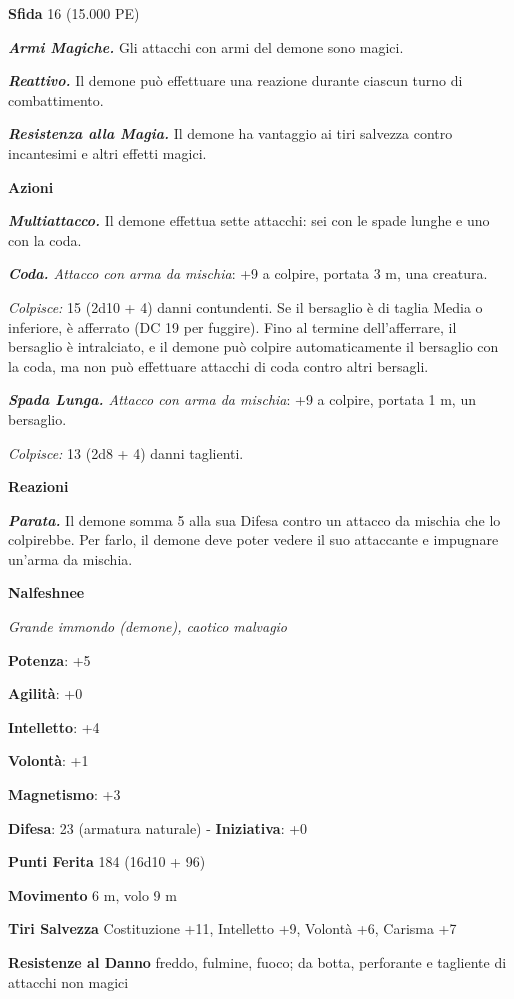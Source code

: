 \begin{multicols}{2}
\textbf{Sfida} 16 (15.000 PE)\smallskip

\emph{\textbf{Armi Magiche.}} Gli attacchi con armi del demone sono
magici.

\emph{\textbf{Reattivo.}} Il demone può effettuare una reazione durante
ciascun turno di combattimento.

\emph{\textbf{Resistenza alla Magia.}} Il demone ha vantaggio ai tiri
salvezza contro incantesimi e altri effetti magici.

\smallskip\textbf{Azioni}

\emph{\textbf{Multiattacco.}} Il demone effettua sette attacchi: sei con
le spade lunghe e uno con la coda.

\emph{\textbf{Coda.} Attacco con arma da mischia}: +9 a colpire, portata
3 m, una creatura.

\emph{Colpisce:} 15 (2d10 + 4) danni contundenti. Se il bersaglio è di
taglia Media o inferiore, è afferrato (DC 19 per fuggire). Fino al
termine dell'afferrare, il bersaglio è intralciato, e il demone può
colpire automaticamente il bersaglio con la coda, ma non può effettuare
attacchi di coda contro altri bersagli.

\emph{\textbf{Spada Lunga.} Attacco con arma da mischia}: +9 a colpire,
portata 1 m, un bersaglio.

\emph{Colpisce:} 13 (2d8 + 4) danni taglienti.

\textbf{Reazioni}

\emph{\textbf{Parata.}} Il demone somma 5 alla sua Difesa contro un attacco
da mischia che lo colpirebbe. Per farlo, il demone deve poter vedere il
suo attaccante e impugnare un'arma da mischia.

\textbf{Nalfeshnee}

\emph{Grande immondo (demone), caotico malvagio}

\textbf{Potenza}: +5

\textbf{Agilità}: +0

\textbf{Intelletto}: +4

\textbf{Volontà}: +1

\textbf{Magnetismo}: +3

\textbf{Difesa}: 23 (armatura naturale) - \textbf{Iniziativa}: +0

\textbf{Punti Ferita} 184 (16d10 + 96)

\textbf{Movimento} 6 m, volo 9 m

\textbf{Tiri Salvezza} Costituzione +11, Intelletto +9, Volontà +6,
Carisma +7

\textbf{Resistenze al Danno} freddo, fulmine, fuoco; da botta,
perforante e tagliente di attacchi non magici


\end{multicols}
